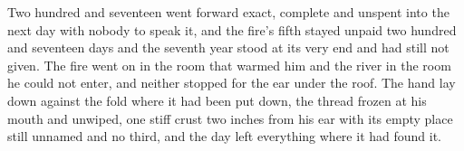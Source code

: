 Two hundred and seventeen went forward exact, complete and unspent into the next day with nobody to speak it, and the fire's fifth stayed unpaid two hundred and seventeen days and the seventh year stood at its very end and had still not given. The fire went on in the room that warmed him and the river in the room he could not enter, and neither stopped for the ear under the roof. The hand lay down against the fold where it had been put down, the thread frozen at his mouth and unwiped, one stiff crust two inches from his ear with its empty place still unnamed and no third, and the day left everything where it had found it.
